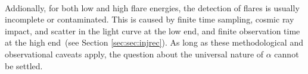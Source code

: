 \documentclass{aa}
\begin{document}
\\
Addionally, for both low and high flare energies, the detection of flares is usually incomplete or contaminated. This is caused by finite time sampling, cosmic ray impact, and scatter in the light curve at the low end, and finite observation time at the high end~(see Section \ref{sec:sec:injrec}). As long as these methodological and observational caveats apply, the question about the universal nature of $\alpha$ cannot be settled.
\end{document}

